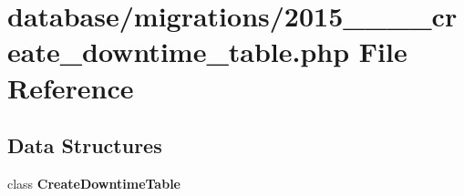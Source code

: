 \section{database/migrations/2015\+\_\+\_\+\_\+\_\+create\+\_\+downtime\+\_\+table.php File Reference}
\label{2015__04__13__224751__create__downtime__table_8php}
\subsection*{Data Structures}
\begin{DoxyCompactItemize}
\item 
class {\bf Create\+Downtime\+Table}
\end{DoxyCompactItemize}
